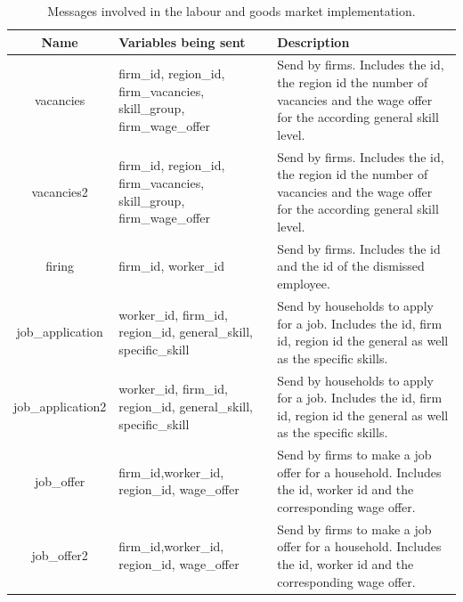 \begin{table}[!htb]\caption{Messages involved in the labour and goods market implementation.}
\begin{center}
\begin{tabular}{|c|l|l|}
\hline
Name & Variables being sent & Description \\
\hline

vacancies & {\parbox[l]{5cm}{firm\_id, region\_id, firm\_vacancies,
skill\_group, firm\_wage\_offer}}& {\parbox[l]{5cm}{Send by firms.
Includes the id, the region id the number of vacancies and the
wage offer for the according general skill level.}} \\

\hline

vacancies2 & {\parbox[l]{5cm}{firm\_id, region\_id, firm\_vacancies,
skill\_group, firm\_wage\_offer}}& {\parbox[l]{5cm}{Send by firms.
Includes the id, the region id the number of vacancies and the
wage offer for the according general skill level.}} \\
\hline

firing & {\parbox[l]{5cm}{firm\_id, worker\_id}}
& {\parbox[l]{5cm}{Send by firms. Includes the id and the id of the dismissed employee.}}  \\

\hline

job\_application & {\parbox[l]{5cm}{worker\_id, firm\_id,
region\_id, general\_skill, specific\_skill}} &
{\parbox[l]{5cm}{Send by households to apply for a job. Includes the
id, firm id, region id the general
as well as the specific skills.}}   \\
\hline


job\_application2 & {\parbox[l]{5cm}{worker\_id, firm\_id,
region\_id, general\_skill, specific\_skill}} &
{\parbox[l]{5cm}{Send by households to apply for a job. Includes the
id, firm id, region id the general
as well as the specific skills.}}   \\
\hline


job\_offer & {\parbox[l]{5cm}{ firm\_id,worker\_id, region\_id,
wage\_offer}} & {\parbox[l]{5cm}{Send by firms to make a job offer
for a household. Includes the id, worker id and the
corresponding wage offer.}}   \\

\hline


job\_offer2 & {\parbox[l]{5cm}{ firm\_id,worker\_id, region\_id,
wage\_offer}} & {\parbox[l]{5cm}{Send by firms to make a job offer
for a household. Includes the id, worker id and the
corresponding wage offer.}}   \\
\hline



\end{tabular}
\end{center}
\end{table}
